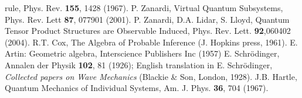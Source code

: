 \documentclass[aps,prl,amsmath,amssymb,twocolumn]{revtex4}
\theoremstyle{plain}
\theoremstyle{definition}
\theoremstyle{remark}
\begin{document}
\begin{references}
  rule, Phys. Rev. {\bf 155}, 1428 (1967).
P. Zanardi, Virtual Quantum Subsystems, Phys. Rev.
  Lett {\bf 87}, 077901 (2001).
 P. Zanardi, D.A. Lidar, S. Lloyd, Quantum
  Tensor Product Structures are Observable Induced, Phys. Rev. Lett.
  {\bf 92},060402 (2004).
R.T. Cox, The Algebra of Probable Inference (J. Hopkins
  press, 1961).
 E. Artin: Geometric algebra, Interscience Publishers Inc
  (1957)
E. Schr\"odinger, Annalen der Physik {\bf 102}, 81
  (1926); English translation in E. Schr\"odinger, {\em Collected
    papers on Wave Mechanics} (Blackie \& Son, London, 1928).
J.B. Hartle, Quantum Mechanics of Individual Systems,
  Am. J.  Phys. {\bf 36}, 704 (1967).
\end{references}
	
	
\end{document}
